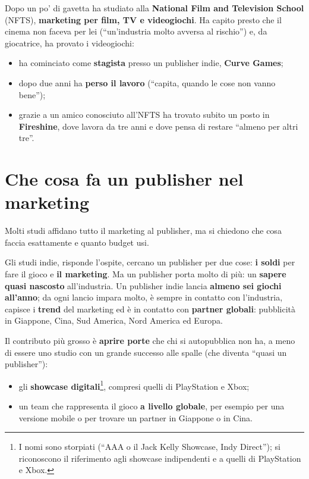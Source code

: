Dopo un po' di gavetta ha studiato alla \textbf{National Film and Television
School} (NFTS), \textbf{marketing per film, TV e videogiochi}. Ha capito presto che
il cinema non faceva per lei (``un'industria molto avversa al rischio'') e, da
giocatrice, ha provato i videogiochi:
\begin{itemize}
  \item ha cominciato come \textbf{stagista} presso un publisher indie,
        \textbf{Curve Games};
  \item dopo due anni ha \textbf{perso il lavoro} (``capita, quando le cose non
        vanno bene'');
  \item grazie a un amico conosciuto all'NFTS ha trovato subito un posto in
        \textbf{Fireshine}, dove lavora da tre anni e dove pensa di restare
        ``almeno per altri tre''.
\end{itemize}

\section{Che cosa fa un publisher nel marketing}
\label{sec:c2-1-publisher}

Molti studi affidano tutto il marketing al publisher, ma si chiedono che cosa
faccia esattamente e quanto budget usi.

Gli studi indie, risponde l'ospite, cercano un publisher per due cose:
\textbf{i soldi} per fare il gioco e \textbf{il marketing}. Ma un publisher porta
molto di più: un \textbf{sapere quasi nascosto} all'industria. Un publisher indie
lancia \textbf{almeno sei giochi all'anno}; da ogni lancio impara molto, è sempre
in contatto con l'industria, capisce i \textbf{trend} del marketing ed è in
contatto con \textbf{partner globali}: pubblicità in Giappone, Cina, Sud America,
Nord America ed Europa.

Il contributo più grosso è \textbf{aprire porte} che chi si autopubblica non ha, a
meno di essere uno studio con un grande successo alle spalle (che diventa ``quasi
un publisher''):
\begin{itemize}
  \item gli \textbf{showcase digitali}\footnote{I nomi sono storpiati (``AAA o il
        Jack Kelly Showcase, Indy Direct''); si riconoscono il riferimento agli
        showcase indipendenti e a quelli di PlayStation e Xbox.}, compresi quelli
        di PlayStation e Xbox;
  \item un team che rappresenta il gioco \textbf{a livello globale}, per esempio
        per una versione mobile o per trovare un partner in Giappone o in Cina.
\end{itemize}

